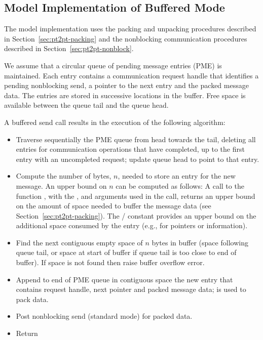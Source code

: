 \subsection{Model Implementation of Buffered Mode}
\label{subsec:pt2pt-modelbuffered}

The model implementation uses the packing and unpacking procedures described in
Section~\ref{sec:pt2pt-packing} and the nonblocking communication procedures
described in Section~\ref{sec:pt2pt-nonblock}.

We assume that a circular queue
of pending message entries (PME) is maintained.  Each
entry contains a communication request handle
that identifies a pending nonblocking
send, a pointer to the next entry and the packed message data.  The
entries are stored in successive locations in the buffer.  Free space is
available between the queue tail and the queue head.

A buffered send call results in the execution of the following algorithm:
\begin{itemize}
\item
Traverse sequentially the PME queue from head towards the tail,
deleting all entries for
communication operations that have completed, up to the first entry with an uncompleted
request; update queue head to point to that entry.
\item
Compute the number of bytes, $n$, needed to store an entry for the new message.
An upper bound on $n$ can be computed
as follows: A call to the function\flushline
{}, with the ,  and  arguments
used in the
 call, returns an upper bound on the amount of
space needed to buffer the message data (see Section~\ref{sec:pt2pt-packing}).
The \MPI/ constant
 provides an upper bound on the
additional space consumed by the entry (e.g., for pointers or 
information).
\item
Find the next contiguous empty space of $n$ bytes in
buffer (space following queue tail, or space at start of buffer if
queue tail is
too close to end of buffer).  If space is not found then raise buffer
overflow error.
\item
Append to end of PME queue in contiguous space the new entry
that contains request
handle, next pointer and packed message data;  is used to
pack data.
\item
Post nonblocking send (standard mode) for packed data.
\item
Return
\end{itemize}

